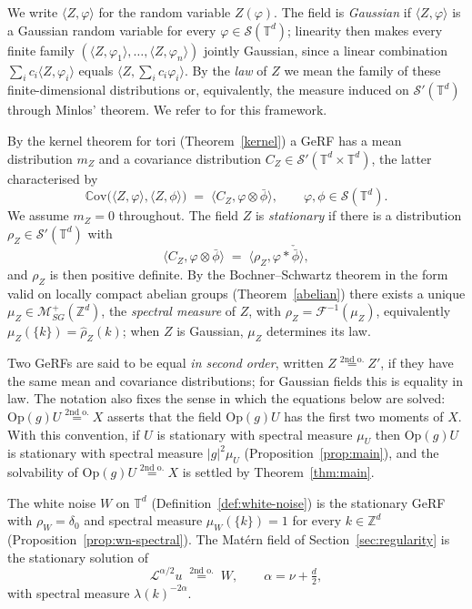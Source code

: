 \documentclass[pdflatex,sn-mathphys,Numbered]{sn-jnl}
\theoremstyle{thmstyleone}%
\theoremstyle{thmstyletwo}%
\theoremstyle{thmstylethree}%
\newcommand{\ZZ}{\mathbb{Z}}
\newcommand{\TT}{\mathbb{T}}
\newcommand{\calL}{\mathcal{L}}
\newcommand{\calS}{\mathcal{S}}
\newcommand{\calM}{\mathcal{M}}
\newcommand{\F}{\mathscr{F}}
\newcommand{\Op}{\mathrm{Op}}
\newcommand{\Cov}{\mathbb{C}\mathrm{ov}}
\newcommand{\eqso}{\stackrel{\text{2nd o.}}{=}}
\begin{document}
We write $\langle Z,\varphi\rangle$ for the random variable $Z(\varphi)$. The
field is \emph{Gaussian} if $\langle Z,\varphi\rangle$ is a Gaussian random
variable for every $\varphi \in \calS(\TT^d)$; linearity then makes every finite
family $(\langle Z,\varphi_1\rangle,\dots,\langle Z,\varphi_n\rangle)$ jointly
Gaussian, since a linear combination $\sum_i c_i\langle Z,\varphi_i\rangle$
equals $\langle Z, \sum_i c_i\varphi_i\rangle$. By the \emph{law} of $Z$ we mean the family of these
finite-dimensional distributions or, equivalently, the measure induced on $\calS'(\TT^d)$
through Minlos' theorem. We refer to \cite{gerfs} for this framework.

By the kernel theorem for tori (Theorem~\ref{kernel}) a GeRF has a mean
distribution $m_Z$ and a covariance distribution $C_Z \in \calS'(\TT^d\times\TT^d)$,
the latter characterised by
\begin{equation}\label{eq:covdist}
    \Cov\bigl(\langle Z,\varphi\rangle, \langle Z,\phi\rangle\bigr)
    \;=\; \langle C_Z, \varphi\otimes\bar\phi\rangle ,
    \qquad \varphi,\phi \in \calS(\TT^d) .
\end{equation}
We assume $m_Z = 0$ throughout. The field $Z$ is \emph{stationary} if there is a
distribution $\rho_Z \in \calS'(\TT^d)$ with
\begin{equation}\label{eq:stationary}
    \langle C_Z, \varphi\otimes\bar\phi\rangle
    \;=\; \langle \rho_Z, \varphi \ast \check{\bar\phi}\rangle ,
\end{equation}
and $\rho_Z$ is then positive definite. By the Bochner--Schwartz theorem in the
form valid on locally compact abelian groups (Theorem~\ref{abelian}) there
exists a unique $\mu_Z \in \calM^+_{SG}(\ZZ^d)$, the \emph{spectral measure} of
$Z$, with $\rho_Z = \F^{-1}(\mu_Z)$, equivalently
$\mu_Z(\{k\}) = \hat\rho_Z(k)$; when $Z$ is Gaussian, $\mu_Z$ determines
its law.

Two GeRFs are said to be equal \emph{in second order}, written
$Z \eqso Z'$, if they have the same mean and covariance distributions;
for Gaussian fields this is equality in law. The notation also fixes the sense
in which the equations below are solved: $\Op(g)U \eqso X$ asserts that the
field $\Op(g)U$ has the
first two moments of $X$. With this convention,
if $U$ is stationary with spectral measure $\mu_U$ then $\Op(g)U$ is stationary
with spectral measure $|g|^2\mu_U$ (Proposition~\ref{prop:main}), and the
solvability of $\Op(g)U \eqso X$ is settled by Theorem~\ref{thm:main}.

The white noise $W$ on $\TT^d$ (Definition~\ref{def:white-noise}) is
the stationary GeRF with $\rho_W = \delta_0$ and spectral measure
$\mu_W(\{k\}) = 1$ for every $k \in \ZZ^d$ (Proposition~\ref{prop:wn-spectral}).
The Mat\'ern field of Section~\ref{sec:regularity} is the stationary solution of
\begin{equation}\label{eq:spde}
    \calL^{\alpha/2} u \;\eqso\; W , \qquad \alpha = \nu + \tfrac d2 ,
\end{equation}
with spectral measure $\lambda(k)^{-2\alpha}$.
\end{document}
